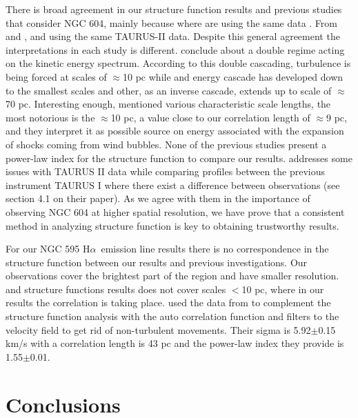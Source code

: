 \documentclass[fleqn,usenatbib, useAMS, a4paper]{mnras}
\newcommand\halpha{H${\alpha}$}
\begin{document}
There is broad agreement in our structure function results and previous studies that consider NGC 604, mainly because where are using the same data \citep{Medina-Tanco:1997a, Melnick:2021x}.
From \citet{Medina-Tanco:1997a} and \citet{Melnick:2021x}, and using the same TAURUS-II data.
Despite this general agreement the interpretations in each study is different.
\citet{Medina-Tanco:1997a} conclude about a double regime acting on the kinetic energy spectrum.
According to this double cascading, turbulence is being forced at scales of \(\approx\)10 pc while and energy cascade has developed down to the smallest scales and other, as an inverse cascade, extends up to scale of \(\approx\)70 pc.
Interesting enough, \citet{Medina-Tanco:1997a} mentioned various characteristic scale lengths, the most notorious is the \(\approx\)10 pc, a value close to our correlation length of \(\approx\)9 pc, and they interpret it as possible source on energy associated with the expansion of shocks coming from wind bubbles.  
None of the previous studies present a power-law index for the structure function to compare our results.
\citet{Melnick:2021x} addresses some issues with TAURUS II data while comparing profiles between the previous instrument TAURUS I where there exist a difference between observations (see section 4.1 on their paper).
As we agree with them in the importance of observing NGC 604 at higher spatial resolution, we have prove that a consistent method in analyzing structure function is key to obtaining trustworthy results.

For our NGC 595 \halpha\ emission line results there is no correspondence in the structure function between our results and previous investigations.
Our observations cover the brightest part of the region and have smaller resolution.
\citet{lagrois2009multi} and \citet{lagrois2011} structure functions results does not cover scales $<$10 pc, where in our results the correlation is taking place.
\citet{lagrois2011} used the data from \citet{lagrois2009multi} to complement the structure function analysis with the auto correlation function and filters to the velocity field to get rid of non-turbulent movements.
Their sigma is 5.92$\pm$0.15 km/s with a correlation length is 43 pc and the power-law index they provide is 1.55$\pm$0.01.


\section{Conclusions}\label{sec:conclusions}
\end{document}
